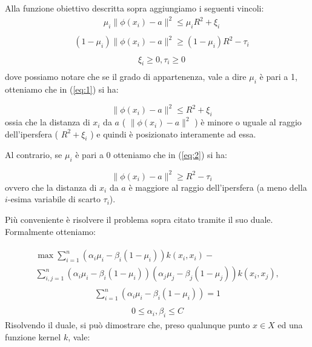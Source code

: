 \documentclass[12pt,italian]{report}
\begin{document}
Alla funzione obiettivo descritta sopra aggiungiamo i seguenti vincoli:
\begin{equation}
\label{eq:1}
\begin{aligned}
\quad \mu_{i} \lVert \phi(x_{i}) - a \rVert ^2 \leq \mu_{i} R^2 + \xi_{i}\\
\end{aligned}
\end{equation}
\begin{equation}
\label{eq:2}
\begin{aligned}
\quad (1 - \mu_{i}) \lVert \phi(x_{i}) - a \rVert ^2 \geq (1 - \mu_{i})R^2 - \tau_{i} \\
\end{aligned}
\end{equation}
\begin{equation}
\label{eq:3}
\begin{aligned}
\quad \xi_{i} \geq 0, \tau_{i} \geq 0 \\
\end{aligned}
\end{equation}
dove possiamo notare che se il grado di appartenenza, vale a dire $  \mu_{i} $ è pari a 1, otteniamo che in (\ref{eq:1}) si ha:

\[\quad \lVert \phi(x_{i}) - a \rVert ^2 \leq R^2 + \xi_{i} \]
ossia che la distanza di $ x_{i} $ da $a$ ( $\lVert \phi(x_{i}) - a \rVert ^2$ ) è minore o uguale al raggio dell'ipersfera ( $R^2 + \xi_{i}$ ) e quindi è posizionato interamente ad essa.

Al contrario, se $ \mu_{i} $ è pari a $ 0 $ otteniamo che in (\ref{eq:2}) si ha:

\[ \quad \lVert \phi(x_{i}) - a \rVert ^2 \geq R^2 - \tau_{i} \]
ovvero che la distanza di $ x_{i} $ da $a$  è maggiore al raggio dell'ipersfera (a meno della $i$-esima variabile di scarto $\tau_{i}$).

Più conveniente è risolvere il problema sopra citato tramite il suo duale. Formalmente otteniamo:

\begin{equation}
\begin{split}
\begin{aligned}
\max \sum_{i=1}^{n} (\alpha_{i} \mu_{i} - \beta_{i}(1-\mu_{i}))k(x_{i}, x_{i}) -\\ \sum_{i,j = 1}^{n}(\alpha_{i} \mu_{i} - \beta_{i}(1-\mu_{i}))(\alpha_{j} \mu_{j} - \beta_{j}(1-\mu_{j}))k(x_{i}, x_{j}), 
\end{aligned}
\end{split}
\end{equation}
\begin{equation}
\begin{aligned}
\sum_{i=1}^{n} (\alpha_{i} \mu_{i} - \beta_{i}(1-\mu_{i})) = 1 \\
\end{aligned}
\end{equation}
\begin{equation}
\begin{aligned}
0 \leq \alpha_{i}, \beta_{i} \leq C
\end{aligned}
\end{equation}
Risolvendo il duale, si può dimostrare che, preso qualunque punto $x \in X$ ed una funzione kernel $k$, vale:
\end{document}
